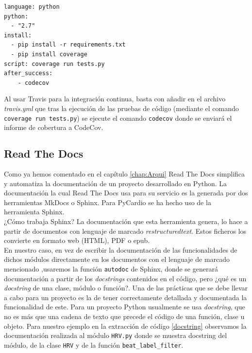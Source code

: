 \begin{lstlisting}[caption={\texttt{.travis.yml} para integrar CodeCov},label=travisCodecov]
language: python
python:
  - "2.7"
install:
  - pip install -r requirements.txt
  - pip install coverage
script: coverage run tests.py
after_success:
    - codecov
\end{lstlisting}

Al usar Travis para la integración continua, basta con añadir en el archivo  \textit{travis.yml} que tras la ejecución de las pruebas de código (mediante el comando \texttt{coverage run tests.py}) se ejecute el comando \texttt{codecov} donde se enviará el informe de cobertura a CodeCov. 

\subsection*{Read The Docs}
\label{subusub:rtd}
Como ya hemos comentado en el capítulo \ref{chap:Arqui} Read The Docs simplifica y automatiza la documentación de un proyecto desarrollado en Python. La documentación la cual Read The Docs usa para su servicio es la generada por dos herramientas MkDocs o Sphinx. Para PyCardio se ha hecho uso de la herramienta Sphinx. \\
¿Cómo trabaja Sphinx? La documentación que esta herramienta genera, lo hace a partir de documentos con lenguaje de marcado \textit{restructuredtext}. Estos ficheros los convierte en formato web (HTML), PDF o epub. \\


En nuestro caso, en vez de escribir la documentación de las funcionalidades de dichos módulos directamente en los documentos con el lenguaje de marcado mencionado ,usaremos la función \texttt{autodoc} de Sphinx, donde se generará documentación a partir de los \textit{docstrings} contenidos en el código, pero ¿qué es un \textit{docstring} de una clase, módulo o función?. Una de las prácticas que se debe llevar a cabo para un proyecto es la de tener correctamente detallada y documentada la funcionalidad de este. Para un proyecto Python usualmente se usa \textit{docstring}, que no es más que una cadena de texto que precede el código de una función, clase u objeto. Para nuestro ejemplo en la extracción de código \ref{docstring} observamos la documentación realizada al módulo \texttt{HRV.py} donde se muestra docstring del módulo, de la clase \texttt{HRV} y de la función \texttt{beat\_label\_filter}.

